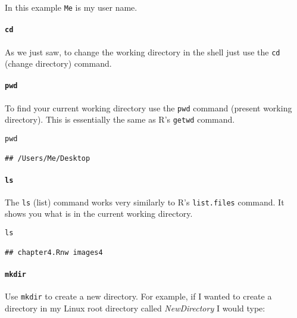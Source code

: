 \noindent In this example \texttt{Me} is my user name. 

\paragraph{{\tt{cd}}}

As we just saw, to change the working directory in the shell just use the {\tt{cd}} (change directory) command.

\paragraph{{\tt{pwd}}}

To find your current working directory use the \texttt{pwd} command (present working directory). This is essentially the same as R's \texttt{getwd} command.

\begin{knitrout}
\color{fgcolor}\begin{kframe}
\begin{verbatim}
pwd

## /Users/Me/Desktop
\end{verbatim}
\end{kframe}
\end{knitrout}


\paragraph{{\tt{ls}}}

The \texttt{ls} (list) command works very similarly to R's \texttt{list.files} command. It shows you what is in the current working directory.

\begin{knitrout}
\color{fgcolor}\begin{kframe}
\begin{verbatim}
ls

## chapter4.Rnw images4
\end{verbatim}
\end{kframe}
\end{knitrout}


\paragraph{{\tt{mkdir}}}

Use \texttt{mkdir} to create a new directory. For example, if I wanted to create a directory in my Linux root directory called {\emph{NewDirectory}} I would type:

